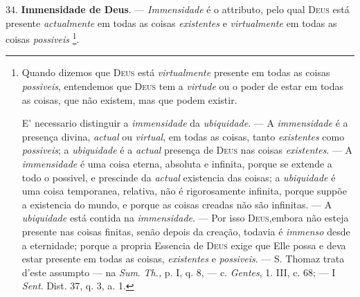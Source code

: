 34. \textbf{Immensidade de Deus}. --- \emph{Immensidade} é o attributo, pelo qual \textsc{Deus} está presente \emph{actualmente} em todas as coisas \emph{existentes} e \emph{virtualmente} em todas as coisas \emph{possiveis} \footnote{Quando dizemos que \textsc{Deus} está \emph{virtualmente} presente em todas as coisas \emph{possiveis}, entendemos que \textsc{Deus} tem a \emph{virtude} ou o poder de estar em todas as coisas, que não existem, mas que podem existir.\par E' necessario distinguir a \emph{immensidade} da \emph{ubiquidade}. --- A \emph{immensidade} é a presença divina, \emph{actual} ou \emph{virtual}, em todas as coisas, tanto \emph{existentes} como \emph{possiveis}; a \emph{ubiquidade} é a \emph{actual} presença de \textsc{Deus} nas coisas \emph{existentes}. --- A \emph{immensidade} é uma coisa eterna, absoluta e infinita, porque se extende a todo o possivel, e prescinde da \emph{actual} existencia das coisas; a \emph{ubiquidade} é uma coisa temporanea, relativa, não é rigorosamente infinita, porque suppõe a existencia do mundo, e porque as coisas creadas não são infinitas. --- A \emph{ubiquidade} está contida na \emph{immensidade}. --- Por isso \textsc{Deus},embora não esteja presente nas coisas finitas, senão depois da creação, todavia é \emph{immenso} desde a eternidade; porque a propria Essencia de \textsc{Deus} exige que Elle possa e deva estar presente em todas as coisas, \emph{existentes} e \emph{possiveis}. --- S. Thomaz trata d'este assumpto --- na \emph{Sum}. \emph{Th.,} p. I, q. 8, --- c. \emph{Gentes}, 1. III, c. 68; --- I \emph{Sent}. Dist. 37, q. 3, a. 1.}.

